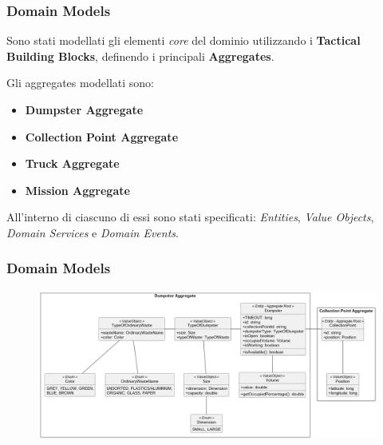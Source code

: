 \begin{frame}
    \frametitle{Domain Models}
    Sono stati modellati gli elementi \textit{core} del dominio utilizzando i \textbf{Tactical Building Blocks},
    definendo i principali \textbf{Aggregates}.

    \bigskip

    Gli aggregates modellati sono:
    \begin{itemize}
        \item \textbf{Dumpster Aggregate}
        \item \textbf{Collection Point Aggregate}
        \item \textbf{Truck Aggregate}
        \item \textbf{Mission Aggregate}
    \end{itemize}

    \bigskip

    All'interno di ciascuno di essi sono stati specificati: \textit{Entities}, \textit{Value Objects},
    \textit{Domain Services} e \textit{Domain Events}.

\end{frame}

\begin{frame}
    \frametitle{Domain Models}

    \begin{figure}[H]
        \centering
        \includegraphics[width=\linewidth]{../img/disposal-domain-model}
    \end{figure}

\end{frame}
